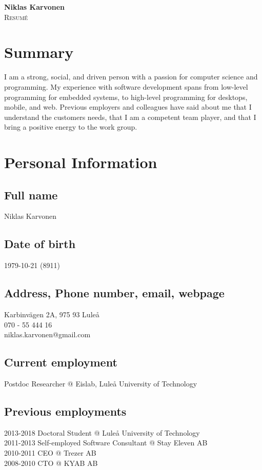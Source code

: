 \documentclass{article}
\makeatletter
\newlength\drop
\newcommand*\titleM{\begingroup%
\setlength\drop{0.08\textheight}
\centering
\vspace*{\drop}
{\Huge\bfseries Niklas Karvonen}\\[\baselineskip]
{\scshape Resumé}\\[\baselineskip]
\vfill
{\large\scshape }\par
\vfill
{\scshape \@date}\par
\vspace*{2\drop}
\endgroup}
\makeatother
\begin{document}
\begin{titlingpage}
\titleM
\end{titlingpage}
\newpage

\tableofcontents
\newpage

\section{Summary}
I am a strong, social, and driven person with a passion for computer science and programming. My experience with software development spans from low-level programming for embedded systems, to high-level programming for desktops, mobile, and web. Previous employers and colleagues have said about me that I  understand the customers needs, that I am a competent team player, and that I bring a positive energy to the work group.

\section{Personal Information}


\subsection{Full name} Niklas Karvonen  \\
\subsection{Date of birth} 1979-10-21 (8911) \\
\subsection{Address, Phone number, email, webpage}
Karbinvägen 2A, 975 93 Luleå \\
070 - 55 444 16 \\ 
niklas.karvonen@gmail.com \\

\subsection{Current employment} Postdoc Researcher @ Eislab, Luleå University of Technology \\
\subsection{Previous employments}
2013-2018 Doctoral Student @ Luleå University of Technology \\
2011-2013 Self-employed Software Consultant @ Stay Eleven AB \\
2010-2011 CEO @ Trezer AB \\
2008-2010 CTO @ KYAB AB \\
\end{document}
